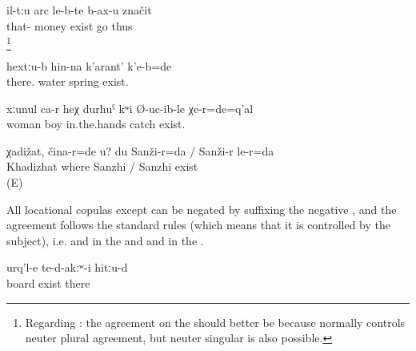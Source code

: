 \begin{exe}
	\ex	\label{ex:This means that (people) go where the money is}
	\gll	il-tːu	arc	le-b-te 	b-ax-u	značit\\
		that-	money	exist 	go	thus\\
	\glt	{}\footnote{Regarding : the agreement on the  should better be  because   normally controls neuter plural agreement, but neuter singular is also possible.}

	\ex	\label{ex:There was a spring up there}
	\gll	hextːu-b	hin-na	k'arant'	k'e-b=de\\
		there.	water	spring	exist.\\
	\glt	{}

	\ex	\label{ex:That is the woman, the one who was keeping the boy in here hands}
	\gll	xːunul	ca-r	heχ	durħuˁ	kʷi	Ø-uc-ib-le	χe-r=de=q'al\\
		woman			boy	in.the.hands	catch	exist.\\
	\glt	{}

	\ex	\label{ex:‎Khadizhat, where are you? I am in Sanzhi_1}
	\gll	χadižat,	čina-r=de	u?	du	Sanži-r=da	/	Sanži-r	le-r=da\\
		Khadizhat	where			Sanzhi	/ Sanzhi exist\\
	\glt	{} (E)

\end{exe}

All locational copulas except  can be negated by suffixing the negative , and the  agreement follows the standard rules (which means that it is controlled by the subject), i.e.  and   in the  and  and  in the  .

\begin{exe}
	\ex	\label{ex:There were no boards there}
	\gll	urq'l-e	te-d-akːʷ-i	hitːu-d\\
		board	exist	there\\
	\glt	{}
\end{exe}

